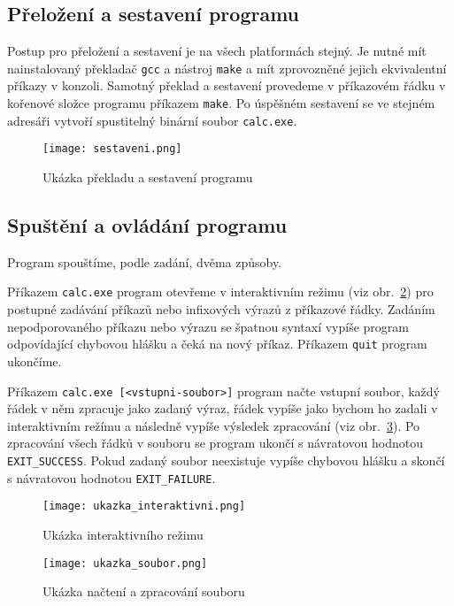 \subsection{Přeložení a sestavení programu}
Postup pro přeložení a sestavení je na všech platformách stejný. Je nutné mít nainstalovaný překladač \verb|gcc| a nástroj \verb|make| a mít zprovozněné jejich ekvivalentní příkazy v konzoli. Samotný překlad a sestavení provedeme v příkazovém řádku v kořenové složce programu příkazem \verb|make|. Po úspěšném sestavení se ve stejném adresáři vytvoří spustitelný binární soubor \verb|calc.exe|.

\begin{figure}[ht]
    \centering
    \texttt{[image: sestaveni.png]}
    \caption{Ukázka překladu a sestavení programu}\label{fig:sestaveni}
\end{figure}

\subsection{Spuštění a ovládání programu}
Program spouštíme, podle zadání, dvěma způsoby. 

Příkazem \verb|calc.exe| program otevřeme v interaktivním režimu (viz obr.~\ref{fig:ukazka_interaktivni}) pro postupné zadávání příkazů nebo infixových výrazů z příkazové řádky. Zadáním nepodporovaného příkazu nebo výrazu se špatnou syntaxí vypíše program odpovídající chybovou hlášku a čeká na nový příkaz. Příkazem \verb|quit| program ukončíme.

Příkazem \verb|calc.exe [<vstupni-soubor>]| program načte vstupní soubor, každý řádek v něm zpracuje jako zadaný výraz, řádek vypíše jako bychom ho zadali v interaktivním režímu a následně vypíše výsledek zpracování (viz obr.~\ref{fig:ukazka_soubor}). Po zpracování všech řádků v souboru se program ukončí s návratovou hodnotou \verb|EXIT_SUCCESS|. Pokud zadaný soubor neexistuje vypíše chybovou hlášku a skončí s návratovou hodnotou \verb|EXIT_FAILURE|. 
\newpage
\begin{figure}[ht]
    \centering
    \texttt{[image: ukazka\_interaktivni.png]}
    \caption{Ukázka interaktivního režimu}\label{fig:ukazka_interaktivni}
\end{figure}
\begin{figure}[ht]
    \centering
    \texttt{[image: ukazka\_soubor.png]}
    \caption{Ukázka načtení a zpracování souboru}\label{fig:ukazka_soubor}
\end{figure}